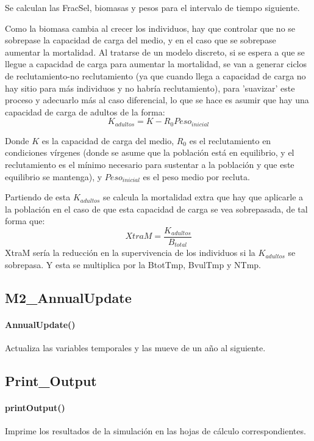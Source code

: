 \documentclass[12pt, oneside, a4paper]{article}
\begin{document}
				Se calculan las FracSel, biomasas y pesos para el intervalo de tiempo siguiente. 
				
				Como la biomasa cambia al crecer los individuos, hay que controlar que no se sobrepase la capacidad de carga del medio, y en el caso que se sobrepase aumentar la mortalidad. Al tratarse de un modelo discreto, si se espera a que se llegue a capacidad de carga para aumentar la mortalidad, se van a generar ciclos de reclutamiento-no reclutamiento (ya que cuando llega a capacidad de carga no hay sitio para más individuos y no habría reclutamiento), para 'suavizar' este proceso y adecuarlo más al caso diferencial, lo que se hace es asumir que hay una capacidad de carga de adultos de la forma:
				\begin{equation}
					K_{adultos}= K - R_0 Peso_{inicial}
				\end{equation}
				  
				 Donde $K$ es la capacidad de carga del medio, $R_0$ es el reclutamiento en condiciones vírgenes (donde se asume que la población está en equilibrio, y el reclutamiento es el mínimo necesario para sustentar a la población y que este equilibrio se mantenga), y $Peso_{inicial}$ es el peso medio por recluta. 
				 
				 Partiendo de esta $K_{adultos}$ se calcula la mortalidad extra que hay que aplicarle a la población en el caso de que esta capacidad de carga se vea sobrepasada, de tal forma que:
				\begin{equation}
					XtraM= \frac{K_{adultos}}{B_{total}} 
				\end{equation}
				 XtraM sería la reducción en la supervivencia de los individuos si la $K_{adultos}$ se sobrepasa. Y esta se multiplica por la BtotTmp, BvulTmp y NTmp.
				
		\subsection{M2\_AnnualUpdate}
			\paragraph{AnnualUpdate()} Actualiza las variables temporales y las mueve de un año al siguiente. 
			
		\subsection{Print\_Output}
			\paragraph{printOutput()} Imprime los resultados de la simulación en las hojas de cálculo correspondientes.
			
\end{document}

